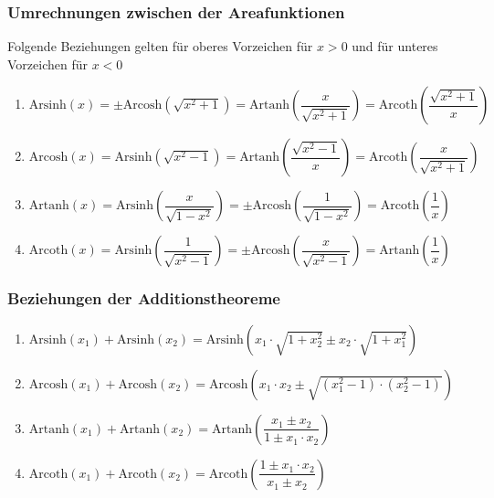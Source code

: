 \subsubsection{Umrechnungen zwischen der Areafunktionen}
Folgende Beziehungen gelten für oberes Vorzeichen für $x>0$ und für unteres Vorzeichen für $x<0$ 
\begin{enumerate}[$(a)$]
\item $\text{Arsinh}\left(x\right)=\pm\text{Arcosh}\left(\sqrt{x^2+1}\right)=\text{Artanh}\left(\dfrac{x}{\sqrt{x^2+1}}\right)=\text{Arcoth}\left(\dfrac{\sqrt{x^2+1}}{x}\right)$
\item $\text{Arcosh}\left(x\right)=\text{Arsinh}\left(\sqrt{x^2-1}\right)=\text{Artanh}\left(\dfrac{\sqrt{x^2-1}}{x}\right)=\text{Arcoth}\left(\dfrac{x}{\sqrt{x^2+1}}\right)$
\item $\text{Artanh}\left(x\right)=\text{Arsinh}\left(\dfrac{x}{\sqrt{1-x^2}}\right)=\pm\text{Arcosh}\left(\dfrac{1}{\sqrt{1-x^2}}\right)=\text{Arcoth}\left(\dfrac{1}{x}\right)$
\item $\text{Arcoth}\left(x\right)=\text{Arsinh}\left(\dfrac{1}{\sqrt{x^2-1}}\right)=\pm\text{Arcosh}\left(\dfrac{x}{\sqrt{x^2-1}}\right)=\text{Artanh}\left(\dfrac{1}{x}\right)$
\end{enumerate}
\subsubsection{Beziehungen der Additionstheoreme}
\begin{enumerate}[$(a)$]
\item $\text{Arsinh}\left(x_1\right)+\text{Arsinh}\left(x_2\right)=\text{Arsinh}\left(x_1\cdot \sqrt{1+x_2^2}\pm x_2\cdot \sqrt{1+x_1^2}\right)$
\item $\text{Arcosh}\left(x_1\right)+\text{Arcosh}\left(x_2\right)=\text{Arcosh}\left(x_1\cdot x_2\pm \sqrt{\left(x_1^2-1\right)\cdot \left(x_2^2-1\right)}\right)$
\item $\text{Artanh}\left(x_1\right)+\text{Artanh}\left(x_2\right)=\text{Artanh}\left(\dfrac{x_1\pm x_2}{1\pm x_1\cdot x_2}\right)$
\item $\text{Arcoth}\left(x_1\right)+\text{Arcoth}\left(x_2\right)=\text{Arcoth}\left(\dfrac{1\pm x_1\cdot x_2}{x_1\pm x_2}\right)$
\end{enumerate}